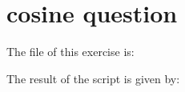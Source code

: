 \section{cosine question}

The file of this exercise is:



The result of the script is given by:


